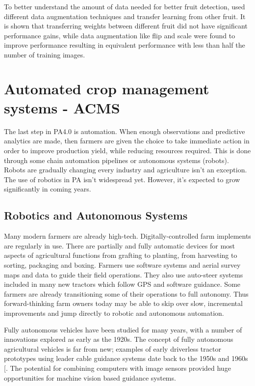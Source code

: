 \documentclass[review]{elsarticle}
\begin{document}
    To better understand the amount of data needed for better fruit detection, \cite{Bargoti_2017} used different data augmentation techniques and transfer learning from other fruit. It is shown that transferring weights between different fruit did not have significant performance gains, while data augmentation like flip and scale  were found to improve performance resulting in equivalent performance with less than half the number of training images.

    \section{Automated crop management systems - ACMS}
    The last step in PA4.0 is automation. When enough observations and predictive analytics are made, then farmers are given the choice to take immediate action in order to improve production yield, while reducing resources required. This is done through some chain automation pipelines or autonomous systems (robots). Robots are gradually changing every industry and agriculture isn’t an exception. The use of robotics in PA isn’t widespread yet. However, it’s expected to grow significantly in coming years.
    \subsection{Robotics and Autonomous Systems}
    Many modern farmers are already high-tech. Digitally-controlled farm implements are regularly in use. There are partially and fully automatic devices for most aspects of agricultural functions from grafting to planting, from harvesting to sorting, packaging and boxing. Farmers use software systems and aerial survey maps and data to guide their field operations. They also use auto-steer systems included in many new tractors which follow GPS and software guidance. Some farmers are already transitioning some of their operations to full autonomy. Thus forward-thinking farm owners today may be able to skip over slow, incremental improvements and jump directly to robotic and autonomous automation.

    Fully autonomous vehicles have been studied for many years, with a number of innovations explored as early as the 1920s. The concept of fully autonomous agricultural vehicles is far from new; examples of early driverless tractor prototypes using leader cable guidance systems date back to the 1950s and 1960s [\cite{Basu_2018}. The potential for combining computers with image sensors provided huge opportunities for machine vision based guidance systems.
\end{document}
